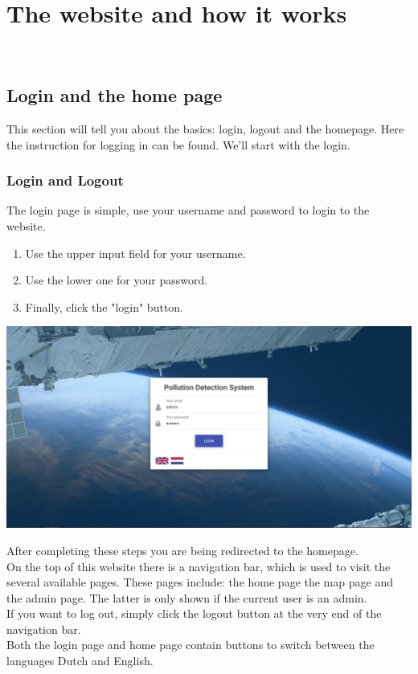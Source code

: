 \documentclass[a4paper]{article}
\begin{document}
\pagebreak

\section{The website and how it works}
~\\

\subsection{Login and the home page}
This section will tell you about the basics: login, logout and the homepage. Here the instruction for logging in can be found. We'll start with the login.
~\\

\subsubsection{Login and Logout}
The login page is simple, use your username and password to login to the website.

\begin{enumerate}
\item Use the upper input field for your username.
\item Use the lower one for your password.
\item Finally, click the "login" button.
\end{enumerate}

\noindent
\includegraphics[width=\textwidth]{login}

\noindent
After completing these steps you are being redirected to the homepage.
\\
On the top of this website there is a navigation bar, which is used to visit the several available pages. These pages include: the home page the map page and the admin page. The latter is only shown if the current user is an admin.
\\
If you want to log out, simply click the logout button at the very end of the navigation bar.
\\
Both the login page and home page contain buttons to switch between the languages Dutch and English.
\end{document}
